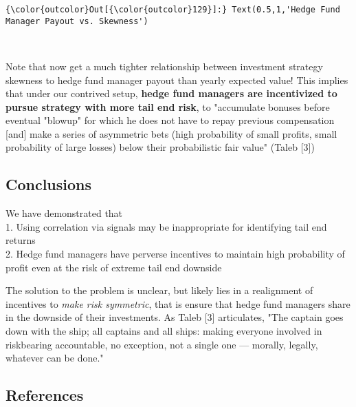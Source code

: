 \documentclass[11pt]{article}
\begin{document}
\begin{Verbatim}[commandchars=\\\{\}]
{\color{outcolor}Out[{\color{outcolor}129}]:} Text(0.5,1,'Hedge Fund Manager Payout vs. Skewness')
\end{Verbatim}
            
    \begin{center}
    \end{center}
    { \hspace*{\fill} \\}
    
    Note that now get a much tighter relationship between investment
strategy skewness to hedge fund manager payout than yearly expected
value! This implies that under our contrived setup, \textbf{hedge fund
managers are incentivized to pursue strategy with more tail end risk},
to "accumulate bonuses before eventual "blowup" for which he does not
have to repay previous compensation {[}and{]} make a series of
asymmetric bets (high probability of small profits, small probability of
large losses) below their probabilistic fair value" (Taleb {[}3{]})

    \subsection{Conclusions}\label{conclusions}

    We have demonstrated that\\
1. Using correlation via signals may be inappropriate for identifying
tail end returns\\
2. Hedge fund managers have perverse incentives to maintain high
probability of profit even at the risk of extreme tail end downside

The solution to the problem is unclear, but likely lies in a realignment
of incentives to \emph{make risk symmetric}, that is ensure that hedge
fund managers share in the downside of their investments. As Taleb
{[}3{]} articulates, "The captain goes down with the ship; all captains
and all ships: making everyone involved in riskbearing accountable, no
exception, not a single one --- morally, legally, whatever can be done."

    \subsection{References}\label{references}
\end{document}
